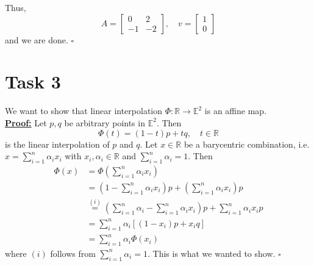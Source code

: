 \documentclass[]{article}
\begin{document}
Thus, \begin{equation*}
A=\left[\begin{array}{cc}
0&2\\
-1&-2
\end{array}\right], \quad v=\left[\begin{array}{c}
1\\
0
\end{array}\right]
\end{equation*}
and we are done. $\square$
\section*{Task 3}
We want to show that linear interpolation $\Phi : \mathbb{R} \rightarrow \mathbb{E}^2$ is an affine map.\\
\underline{\textbf{Proof:}} Let $p,q$ be arbitrary points in $\mathbb{E}^2$. Then \begin{equation*}
\Phi (t) = (1-t)p + tq, \quad t\in \mathbb{R}
\end{equation*}
is the linear interpolation of $p$ and $q$. Let $x\in \mathbb{R}$ be a barycentric combination, i.e. $x=\sum_{i=1}^{n}\alpha_i x_i$ with $x_i, \alpha_i\in \mathbb{R}$ and $\sum_{i=1}^{n}\alpha_i = 1$. Then \begin{equation*}
\begin{aligned}
\Phi (x) &= \Phi (\sum_{i=1}^{n}\alpha_i x_i)\\
&=(1-\sum_{i=1}^{n}\alpha_i x_i)p + (\sum_{i=1}^{n}\alpha_i x_i)p\\
&\overset{(i)}{=}(\sum_{i=1}^{n}\alpha_i-\sum_{i=1}^{n}\alpha_i x_i)p + \sum_{i=1}^{n}\alpha_i x_ip\\
&=\sum_{i=1}^{n}\alpha_i[(1-x_i)p + x_iq]\\
&=\sum_{i=1}^{n}\alpha_i\Phi(x_i)
\end{aligned}
\end{equation*}
where $(i)$ follows from $\sum_{i=1}^{n}\alpha_i=1$. This is what we wanted to show. $\square$\\

\newpage
\end{document}
